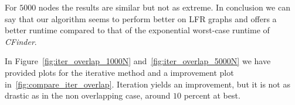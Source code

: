For $5000$ nodes the results are similar but not as extreme. In conclusion we can 
say that our algorithm seems to perform better on LFR graphs and offers a better runtime 
compared to that of the exponential worst-case runtime of \textit{CFinder}.

In Figure~\ref{fig:iter_overlap_1000N} and~\ref{fig:iter_overlap_5000N} we 
have provided plots for the iterative method and a improvement plot 
in~\ref{fig:compare_iter_overlap}. Iteration yields an improvement, 
but it is not as drastic as in the non overlapping case, around $10$ percent at best.
